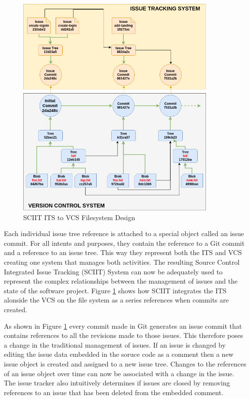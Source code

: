 \documentclass{mproj}
\begin{document}
\begin{figure}[t]
\caption{SCIIT ITS to VCS Filesystem Design}
\label{fig:sciit-filesystem}
\centering
\includegraphics[width=10cm]{sciit-filesystem}
\end{figure}


Each individual issue tree reference is attached to a special object called an issue commit. For all intents and purposes, they contain the reference to a Git commit and a reference to an issue tree. This way they represent both the ITS and VCS creating one system that manages both activities. The resulting Source Control Integrated Issue Tracking (SCIIT) System can now be adequately used to represent the complex relationships between the management of issues and the state of the software project. Figure \ref{fig:sciit-filesystem} shows how SCIIT integrates the ITS alonside the VCS on the file system as a series references when commits are created.

As shown in Figure \ref{fig:sciit-filesystem} every commit made in Git generates an issue commit that contains references to all the revisions made to those issues. This therefore poses a change in the traditional management of issues. If an issue is changed by editing the issue data embedded in the soruce code as a comment then a new issue object is created and assigned to a new issue tree. Changes to the references of an issue object over time can now be associated with a change in the issue. The issue tracker also intuitively determines if issues are closed by removing references to an issue that has been deleted from the embedded comment.
\end{document}
